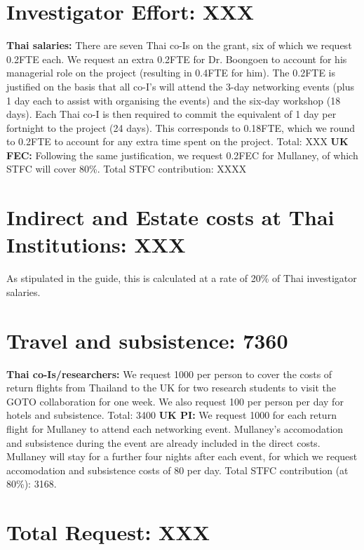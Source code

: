 \documentclass[11pt]{article}
\begin{document}
\vspace{-3mm}
\section{Investigator Effort: XXX}
\vspace{-3mm}
{\bf Thai salaries:} There are seven Thai co-Is on the grant, six of which we request 0.2FTE each. We request an extra 0.2FTE for Dr. Boongoen to account for his managerial role on the project (resulting in 0.4FTE for him). The 0.2FTE is justified on the basis that all co-I's will attend the 3-day networking events (plus 1 day each to assist with organising the events) and the six-day workshop (18 days). Each Thai co-I is then required to commit the equivalent of 1 day per fortnight to the project (24 days). This corresponds to 0.18FTE, which we round to 0.2FTE to account for any extra time spent on the project. Total: XXX {\bf UK FEC:} Following the same justification, we request 0.2FEC for Mullaney, of which STFC will cover 80\%. Total STFC contribution: XXXX

\vspace{-3mm}
\section{Indirect and Estate costs at Thai Institutions: XXX}
\vspace{-3mm}
As stipulated in the guide, this is calculated at a rate of 20\% of Thai investigator salaries.

\vspace{-3mm}
\section{Travel and subsistence: 7360}
\vspace{-3mm}
{\bf Thai co-Is/researchers:} We request 1000 per person to cover the costs of return flights from Thailand to the UK for two research students to visit the GOTO collaboration for one week. We also request 100 per person per day for hotels and subsistence. Total: 3400 {\bf UK PI:} We request 1000 for each return flight for Mullaney to attend each networking event. Mullaney's accomodation and subsistence during the event are already included in the direct costs. Mullaney will stay for a further four nights after each event, for which we request accomodation and subsistence costs of 80 per day. Total STFC contribution (at 80\%): 3168.

\vspace{-3mm}
\section{Total Request: XXX}
\end{document}
